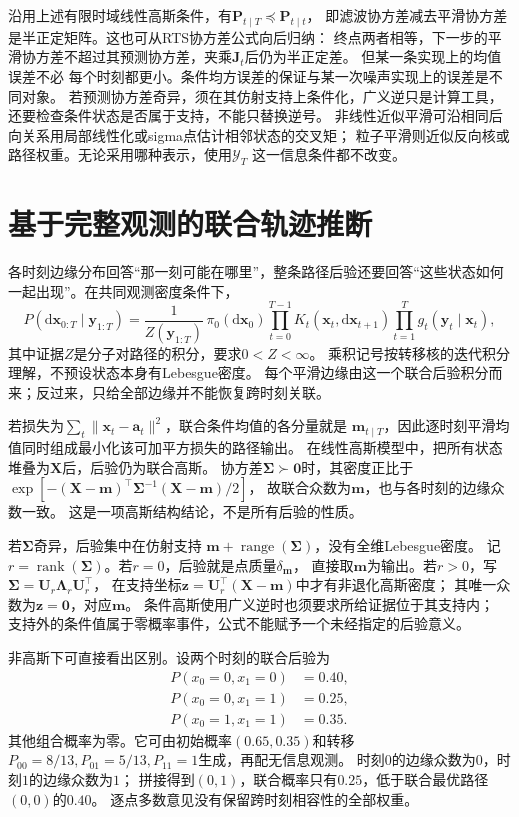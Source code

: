 沿用上述有限时域线性高斯条件，有$\bm P_{t\mid T}\preceq\bm P_{t\mid t}$，
即滤波协方差减去平滑协方差是半正定矩阵。这也可从RTS协方差公式向后归纳：
终点两者相等，下一步的平滑协方差不超过其预测协方差，夹乘$\bm J_t$后仍为半正定差。
但某一条实现上的均值误差不必
每个时刻都更小。条件均方误差的保证与某一次噪声实现上的误差是不同对象。
若预测协方差奇异，须在其仿射支持上条件化，广义逆只是计算工具，
还要检查条件状态是否属于支持，不能只替换逆号。
非线性近似平滑可沿相同后向关系用局部线性化或sigma点估计相邻状态的交叉矩；
粒子平滑则近似反向核或路径权重。无论采用哪种表示，使用$\mathcal Y_T$
这一信息条件都不改变。

\section{基于完整观测的联合轨迹推断}
各时刻边缘分布回答“那一刻可能在哪里”，整条路径后验还要回答“这些状态如何
一起出现”。在共同观测密度条件下，
\begin{equation}
 P(\mathrm d\bm x_{0:T}\mid\bm y_{1:T})
   =\frac1{Z(\bm y_{1:T})}\,
      \pi_0(\mathrm d\bm x_0)
      \prod_{t=0}^{T-1}K_t(\bm x_t,\mathrm d\bm x_{t+1})
      \prod_{t=1}^Tg_t(\bm y_t\mid\bm x_t),
 \label{eq:action-state-trajectory-posterior}
\end{equation}
其中证据$Z$是分子对路径的积分，要求$0<Z<\infty$。
乘积记号按转移核的迭代积分理解，不预设状态本身有Lebesgue密度。
每个平滑边缘由这一个联合后验积分而来；反过来，只给全部边缘并不能恢复跨时刻关联。

若损失为$\sum_t\|\bm x_t-\bm a_t\|^2$，联合条件均值的各分量就是
$\bm m_{t\mid T}$，因此逐时刻平滑均值同时组成最小化该可加平方损失的路径输出。
在线性高斯模型中，把所有状态堆叠为$\bm X$后，后验仍为联合高斯。
协方差$\bm\Sigma\succ\bm0$时，其密度正比于
$\exp[-(\bm X-\bm m)^\top\bm\Sigma^{-1}(\bm X-\bm m)/2]$，
故联合众数为$\bm m$，也与各时刻的边缘众数一致。
这是一项高斯结构结论，不是所有后验的性质。

若$\bm\Sigma$奇异，后验集中在仿射支持
$\bm m+\operatorname{range}(\bm\Sigma)$，没有全维Lebesgue密度。
记$r=\operatorname{rank}(\bm\Sigma)$。若$r=0$，后验就是点质量$\delta_{\bm m}$，
直接取$\bm m$为输出。若$r>0$，写$\bm\Sigma=\bm U_r\bm\Lambda_r\bm U_r^\top$，
在支持坐标$\bm z=\bm U_r^\top(\bm X-\bm m)$中才有非退化高斯密度；
其唯一众数为$\bm z=\bm0$，对应$\bm m$。
条件高斯使用广义逆时也须要求所给证据位于其支持内；
支持外的条件值属于零概率事件，公式不能赋予一个未经指定的后验意义。

非高斯下可直接看出区别。设两个时刻的联合后验为
\[
 \begin{aligned}
  P(x_0=0,x_1=0)&=0.40,\\
  P(x_0=0,x_1=1)&=0.25,\\
  P(x_0=1,x_1=1)&=0.35.
 \end{aligned}
\]
其他组合概率为零。它可由初始概率$(0.65,0.35)$和转移
$P_{00}=8/13,P_{01}=5/13,P_{11}=1$生成，再配无信息观测。
时刻$0$的边缘众数为$0$，时刻$1$的边缘众数为$1$；
拼接得到$(0,1)$，联合概率只有$0.25$，低于联合最优路径$(0,0)$的$0.40$。
逐点多数意见没有保留跨时刻相容性的全部权重。

